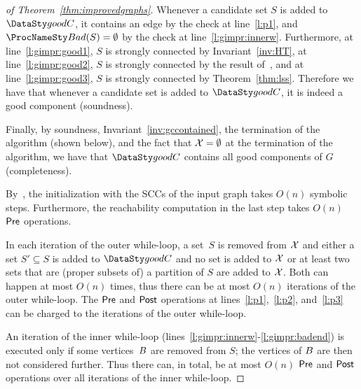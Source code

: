 \begin{proof}[of Theorem~\ref{thm:improvedgraphs}]

\smallskip{}
	Whenever a candidate set $S$ is added to $\goodC$, it contains an edge
    by the check at line~\ref{l:p1}, and $\bad(S) = \emptyset$ by the check at
    line~\ref{l:gimpr:innerw}. Furthermore,  at line~\ref{l:gimpr:good1}, $S$
    is strongly connected by Invariant~\ref{inv:HT},  at line~\ref{l:gimpr:good2},
    $S$ is strongly connected by the result of~\sccalg, and  at
    line~\ref{l:gimpr:good3}, $S$ is strongly connected by Theorem~\ref{thm:lss}.
    Therefore we have that whenever a candidate set is added to $\goodC$,
    it is indeed a good component (soundness).

    Finally, by soundness, Invariant~\ref{inv:gccontained}, the termination of 
    the algorithm (shown below), and the fact that $\mathcal{X} = \emptyset$ at the
    termination of the algorithm, we have that $\goodC$ contains all good
    components of $G$ (completeness).

\smallskip{}
	By~\cite{GentiliniPP08}, the initialization with the SCCs of
	the input graph takes $O(n)$ symbolic steps.
	Furthermore, the reachability computation in the last step
	takes $O(n)$ $\mathsf{Pre}$ operations.
	
	In each iteration of the outer while-loop, a set~$S$ is removed 
	from $\mathcal{X}$ and either  a set $S' \subseteq S$ is added
    to $\goodC$ and no set is added to $\mathcal{X}$ or  at least two
    sets that are (proper subsets of) a partition of $S$ are added to $\mathcal{X}$.
    Both can happen at most $O(n)$ times,
	thus there can be at most $O(n)$ iterations of the outer while-loop.
	The $\mathsf{Pre}$ and $\mathsf{Post}$ operations at lines~\ref{l:p1},~\ref{l:p2}, 
    and~\ref{l:p3} can be charged to the iterations of the outer while-loop.
    
	An iteration of the inner while-loop (lines~\ref{l:gimpr:innerw}-\ref{l:gimpr:badend})
	is executed only if some vertices~$B$
	are removed from $S$; the vertices of $B$
	are then not considered further. Thus there can, in total, be at most $O(n)$
	$\mathsf{Pre}$ and $\mathsf{Post}$ operations over all iterations of the inner while-loop.
	

\end{proof}
